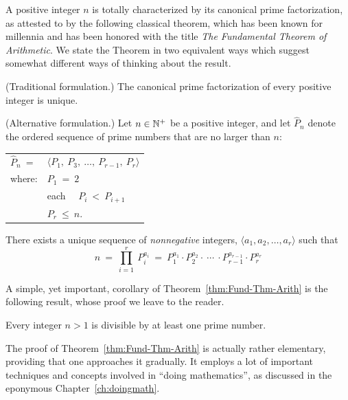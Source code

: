 A positive integer $n$ is totally characterized by its canonical prime
factorization, as attested to by the following classical theorem,
which has been known for millennia and has been honored with the title
{\em The Fundamental Theorem of Arithmetic}.
We state the Theorem in two equivalent ways which suggest somewhat
different ways of thinking about the result.

\begin{theorem}
\label{thm:Fund-Thm-Arith}

\noindent
{\rm (Traditional formulation.)}
%
The canonical prime factorization of every positive integer is unique.

\noindent
{\rm (Alternative formulation.)}
%
Let $n \in \mathbb{N}^+$ be a positive integer, and let $\widehat{P}_n$ denote the
ordered sequence of prime numbers that are no larger than $n$:

\begin{tabular}{ll}
$\widehat{P}_n \ =$  & $\langle P_1, \ P_3, \ \ldots, \ P_{r-1}, \ P_r \rangle$ \\
where:               & $P_1 \ = \ 2$ \\
                     & each  \ \ $P_i \ < \ P_{i+1}$ \\
                     & $P_r \ \leq \ n$.
\end{tabular}

\noindent
There exists a unique sequence of {\em nonnegative} integers, 
$\langle a_1, a_2, \ldots, a_r \rangle$
such that
\[
n \ = \ \prod_{i=1}^r \ P_i^{a_i} \ = \
P_1^{a_1} \cdot P_2^{a_2} \cdot \ \cdots \ \cdot P_{r-1}^{a_{r-1}} \cdot P_r^{a_r}
\]
\end{theorem}

A simple, yet important, corollary of Theorem~\ref{thm:Fund-Thm-Arith}
is the following result, whose proof we leave to the reader.

\begin{prop}
\label{thm:prime-divisor}
Every integer $n>1$ is divisible by at least one prime number.
\end{prop}

\bigskip

%
The proof of Theorem~\ref{thm:Fund-Thm-Arith} is actually rather
elementary, providing that one approaches it gradually.  It employs a
lot of important techniques and concepts involved in ``doing
mathematics'', as discussed in the eponymous
Chapter~\ref{ch:doingmath}.

